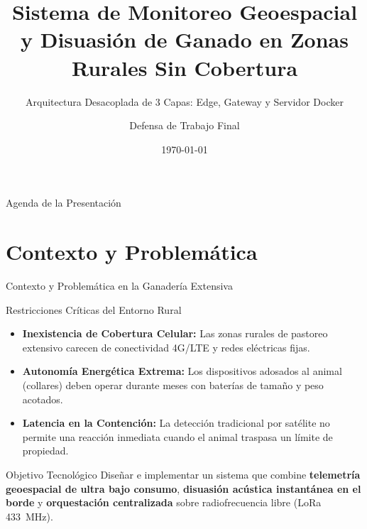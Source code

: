 \documentclass[aspectratio=43]{beamer}
\title[Monitoreo Geoespacial de Ganado IoT]{Sistema de Monitoreo Geoespacial y Disuasión de Ganado en Zonas Rurales Sin Cobertura}
\subtitle{Arquitectura Desacoplada de 3 Capas: Edge, Gateway y Servidor Docker}
\author[Trabajo Final]{Defensa de Trabajo Final}
\institute[UNLP]{
    Facultad de Informática\\
    Universidad Nacional de La Plata
}
\date{\today}
\begin{document}
\begin{frame}
    \titlepage
\end{frame}

\begin{frame}{Agenda de la Presentación}
    \tableofcontents
\end{frame}

\section{Contexto y Problemática}

\begin{frame}{Contexto y Problemática en la Ganadería Extensiva}
    \begin{block}{Restricciones Críticas del Entorno Rural}
        \small
        \begin{itemize}
            \item \textbf{Inexistencia de Cobertura Celular:} Las zonas rurales de pastoreo extensivo carecen de conectividad 4G/LTE y redes eléctricas fijas.
            \item \textbf{Autonomía Energética Extrema:} Los dispositivos adosados al animal (collares) deben operar durante meses con baterías de tamaño y peso acotados.
            \item \textbf{Latencia en la Contención:} La detección tradicional por satélite no permite una reacción inmediata cuando el animal traspasa un límite de propiedad.
        \end{itemize}
    \end{block}

    \begin{alertblock}{Objetivo Tecnológico}
        \small
        Diseñar e implementar un sistema que combine \textbf{telemetría geoespacial de ultra bajo consumo}, \textbf{disuasión acústica instantánea en el borde} y \textbf{orquestación centralizada} sobre radiofrecuencia libre (LoRa 433~MHz).
    \end{alertblock}
\end{frame}
\end{document}
